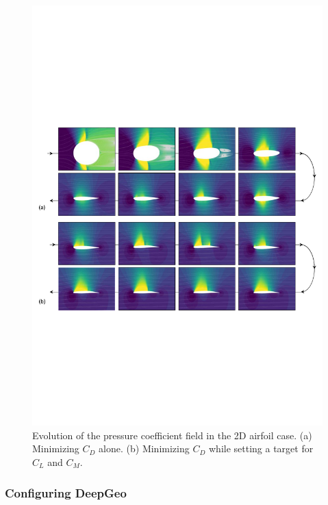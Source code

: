 \begin{figure}[!htb]
    \begin{center}
        \includegraphics[width=1\linewidth]{chapter5/fig/circle2airfoil_optim_field_visualization.pdf}
    \end{center}
      \vspace{-7mm}
    \caption{
        \small  Evolution of the pressure coefficient field in the 2D airfoil case.  (a) Minimizing $C_D$ alone. (b) Minimizing $C_D$ while setting a target for $C_L$ and $C_M$.
    }
    \label{ch5:fig:cs1_cp}
\end{figure}

\subsubsection{Configuring DeepGeo}

